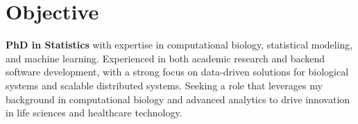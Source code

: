 \section{Objective}
\textbf{PhD in Statistics} with expertise in computational biology, statistical modeling, and machine learning. Experienced in both academic research and backend software development, with a strong focus on data-driven solutions for biological systems and scalable distributed systems. Seeking a role that leverages my background in computational biology and advanced analytics to drive innovation in life sciences and healthcare technology.
